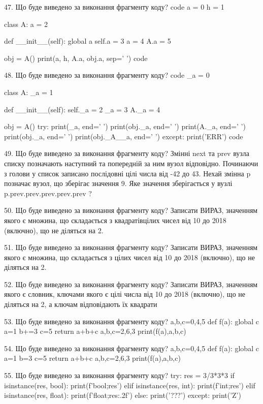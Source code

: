 \documentclass[11pt]{article}
\begin{document}
47. Що буде виведено за виконання фрагменту коду?
code
a = 0
h = 1

class A:
    a = 2
    
    def __init__(self):
global a        self.a = 3
        a = 4
        A.a = 5

obj = A()
print(a, h, A.a, obj.a, sep=' ')
code


48. Що буде виведено за виконання фрагменту коду?
code
_a = 0

class A:
    _a = 1
    
    def __init__(self):
        self._a = 2
        _a = 3
        A._a = 4

obj = A()
try:
    print(_a, end=' ')
    print(obj._a, end=' ')
    print(A._a, end=' ')
    print(obj._a, end=' ')
    print(obj._A__a, end=' ')
except:
    print('ERR')
code


49. Що буде виведено за виконання фрагменту коду?
Змінні next та prev вузла списку позначають наступний та попередній за ним вузол відповідно. Починаючи з голови у список записано послідовні цілі числа від -42 до 43. Нехай змінна p позначає вузол, що зберігає значення 9.
Яке значення зберігається у вузлі p.prev.prev.prev.prev.prev ?

50. Що буде виведено за виконання фрагменту коду?
Записати ВИРАЗ, значенням якого є множина, що складається з квадратівцілих чисел від 10 до 2018 (включно), що не діляться на 2.

51. Що буде виведено за виконання фрагменту коду?
Записати ВИРАЗ, значенням якого є множина, що складається з цілих чисел від 10 до 2018 (включно), що не діляться на 2.

52. Що буде виведено за виконання фрагменту коду?
Записати ВИРАЗ, значенням якого є словник, ключами якого є цілі числа від 10 до 2018 (включно), що не діляться на 2, а ключам відповідають їх квадрати 

53. Що буде виведено за виконання фрагменту коду?
a,b,c=0,4,5
   def f(a):
     global c     a=1
     b+=3
     c=5
     return a+b+c
   a,b,c=2,6,3
   print(f(a),a,b,c)

54. Що буде виведено за виконання фрагменту коду?
a,b,c=0,4,5
   def f(a):
     global c     a=1
     b=3
     c=5
     return a+b+c
   a,b,c=2,6,3
   print(f(a),a,b,c)

55. Що буде виведено за виконання фрагменту коду?
try:
    res = 3/3*3*3
    if isinstance(res, bool):
        print(f'bool;{res}')
    elif isinstance(res, int):
        print(f'int;{res}')
    elif isinstance(res, float):
        print(f'float;{res:.2f}')
    else:
        print('???')
except:
    print('Z')
\end{document}
